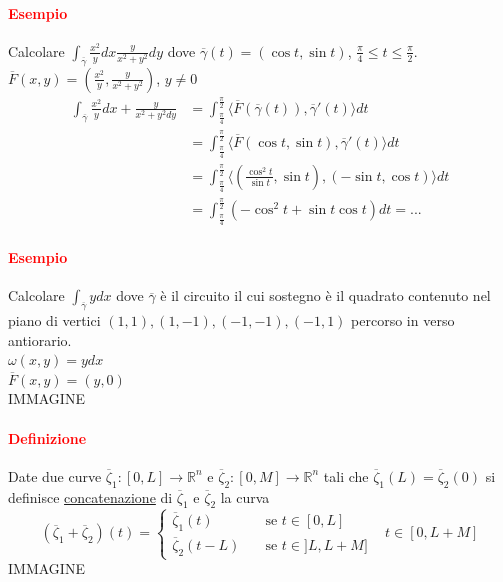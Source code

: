 \documentclass{article}
\newcommand{\R}{\mathbb{R}}
\begin{document}
\paragraph{\textcolor{red}{Esempio}}
Calcolare $\int_{\overline{\gamma}}\frac{x^2}{y}dx \frac{y}{x^2+y^2}dy$ dove $\overline{\gamma}(t)=(\cos t , \sin t)$, $\frac{\pi}{4}\leq t \leq \frac{\pi}{2}$.\\
$\overline{F}(x,y)=\left( \frac{x^2}{y}, \frac{y}{x^2+y^2} \right)$, $y\neq 0$
\begin{align*}
    \int_{\overline{\gamma}}\frac{x^2}{y}dx + \frac{ y}{x^2+y^2 dy} &= \int_{\frac{\pi}{4}}^{\frac{\pi}{2}}\langle \overline{F}(\overline{\gamma}(t)),\overline{\gamma}'(t) \rangle dt\\
    &=\int_{\frac{\pi}{4}}^{\frac{\pi}{2}}\langle \overline{F}(\cos t , \sin t), \overline{\gamma}'(t) \rangle dt\\
    &= \int_{\frac{\pi}{4}}^{\frac{\pi}{2}}\langle \left( \frac{\cos^2 t}{\sin t}, \sin t \right), \left( -\sin t, \cos t \right) \rangle dt\\
    &=\int_{\frac{\pi}{4}}^{\frac{\pi}{2}}(-\cos^2 t+\sin t \cos t)dt=...
\end{align*}

\paragraph{\textcolor{red}{Esempio}}
Calcolare $\int_{\overline{\gamma}}y dx$ dove $\overline{\gamma}$ è il circuito il cui sostegno è il quadrato contenuto nel piano di vertici $(1,1),(1,-1),(-1,-1),(-1,1)$ percorso in verso antiorario. \\
$\omega(x,y)= y dx$\\
$\overline{F}(x,y)=(y,0)$\\
IMMAGINE

\paragraph{\textcolor{red}{Definizione}}
Date due curve $\overline{\zeta}_1:[0,L]\rightarrow \R^n$ e $\overline{\zeta}_2:[0,M]\rightarrow \R^n$ tali che $\overline{\zeta}_1(L)=\overline{\zeta}_2(0)$ si definisce \underline{concatenazione} di $\overline{\zeta}_1$ e $\overline{\zeta}_2$ la curva 
\begin{equation*}
    (\overline{\zeta}_1+\overline{\zeta}_2)(t)=\begin{cases}
    \overline{\zeta}_1 (t)\,\,\,\, &\text{  se  } t\in[0,L]\\
    \overline{\zeta}_2 (t-L) \,\,\,\, &\text{  se  } t \in ]L,L+M]
\end{cases}\,\,\,\,\, t \in [0,L+M]
\end{equation*}
IMMAGINE
\end{document}
